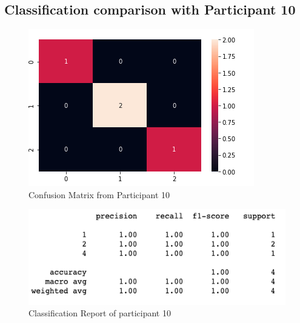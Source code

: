 \pagebreak
\subsection*{Classification comparison with Participant 10}

\begin{figure}[!htp]
    \includegraphics[width=\textwidth]{Images/p10.png}
    \caption{Confusion Matrix from Participant 10}
    \label{fig:f11}
\end{figure}

\begin{figure}[!htp]
    \includegraphics[width=\textwidth]{Images/p10r.png}
    \caption{Classification Report of participant 10}
    \label{fig:f11}
\end{figure}

\pagebreak

